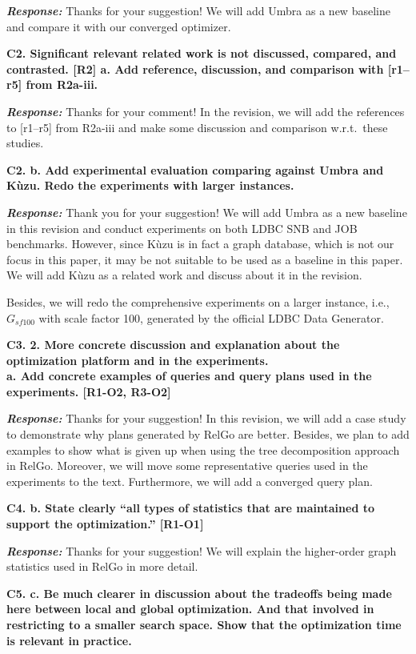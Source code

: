 \textbf{\textit{Response: }}
Thanks for your suggestion! We will add Umbra as a new baseline and compare it with our converged optimizer.


\textbf{
C2. Significant relevant related work is not discussed, compared, and contrasted. [R2]
a. Add reference, discussion, and comparison with [r1–r5] from R2a-iii.
}

\textbf{\textit{Response: }}
Thanks for your comment! In the revision, we will add the references to [r1--r5] from R2a-iii and make some discussion and comparison w.r.t.~these studies.


\textbf{C2. b. Add experimental evaluation comparing against Umbra and Kùzu. Redo the experiments with larger instances.}

\textbf{\textit{Response: }}
Thank you for your suggestion! We will add Umbra as a new baseline in this revision and conduct experiments on both LDBC SNB and JOB benchmarks. 
However, since Kùzu is in fact a graph database, which is not our focus in this paper, it may be not suitable to be used as a baseline in this paper.
We will add Kùzu as a related work and discuss about it in the revision.

Besides, we will redo the comprehensive experiments on a larger instance, i.e., $G_{sf100}$ with scale factor 100, generated by the official LDBC Data Generator.


\textbf{
C3. 2. More concrete discussion and explanation about the optimization platform and in the experiments. \\
a. Add concrete examples of queries and query plans used in the experiments. [R1-O2, R3-O2]
}

\textbf{\textit{Response: }}
Thanks for your suggestion! In this revision, we will add a case study to demonstrate why plans generated by RelGo are better.
Besides, we plan to add examples to show what is given up when using the tree decomposition approach in RelGo.
Moreover, we will move some representative queries used in the experiments to the text.
Furthermore, we will add a converged query plan.

\textbf{
C4. b. State clearly “all types of statistics that are maintained to support the optimization.” [R1-O1]}

\textbf{\textit{Response: }}
Thanks for your suggestion! We will explain the higher-order graph statistics used in RelGo in more detail.


\textbf{
C5. c. Be much clearer in discussion about the tradeoffs being made here between local and global optimization. And that involved in restricting to a smaller search space. Show that the optimization time is relevant in practice.}

